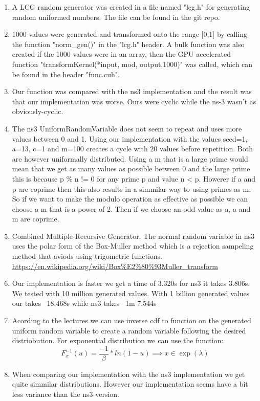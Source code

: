 \documentclass{article}
\begin{document}
\begin{enumerate}
  \item A LCG random generator was created in a file named "lcg.h" for generating random uniformed numbers. The file can be found in the git repo.
  \item 1000 values were generated and transformed onto the range [0,1] by calling the function "norm\_gen()" in the "lcg.h" header. A bulk function was also created if the 1000 values were in an array, then the GPU accelerated function "transformKernel(*input, mod, output,1000)" was called, which can be found in the header "func.cuh".
  \item Our function was compared with the ns3 implementation and the result was that our implementation was worse. Ours were cyclic while the ns-3 wasn't as obviously-cyclic.
  \item The ns3 UniformRandomVariable does not seem to repeat and uses more values between 0 and 1. Using our implementation with the values seed=1, a=13, c=1 and m=100 creates a cycle with 20 values before repetition. Both are however uniformally distributed. Using a m that is a large prime would mean that we get as many values as possible between 0 and the large prime this is because p \% n != 0 for any prime p and value n < p. Howerer if a and p are coprime then this also results in a simmilar way to using primes as m. So if we want to make the modulo operation as effective as possible we can choose a m that is a power of 2. Then if we choose an odd value as a, a and m are coprime.
  \item Combined Multiple-Recursive Generator. The normal random variable in ns3 uses the polar form of the Box-Muller method which is a rejection sampeling method that aviods using trigometric functions. \url{https://en.wikipedia.org/wiki/Box\%E2\%80\%93Muller_transform}
  \item Our implementation is faster we get a time of 3.320s for ns3 it takes 3.806s. We tested with 10 million generated values. With 1 billion generated values our takes ~18.468s while ns3 takes ~1m 7.544s
  \item Acording to the lectures we can use inverse cdf to function on the generated uniform random variable to create a random variable following the desired distriobution. For exponential distribution we can use the function:$$ F^{-1}_x(u) = \frac{-1}{\beta} * ln(1-u) \implies x \in \exp{(\lambda)} $$
  \item When comparing our implementation with the ns3 implementation we get quite simmilar distributions. However our implementation seems have a bit less variance than the ns3 version.
\end{enumerate}
\end{document}
